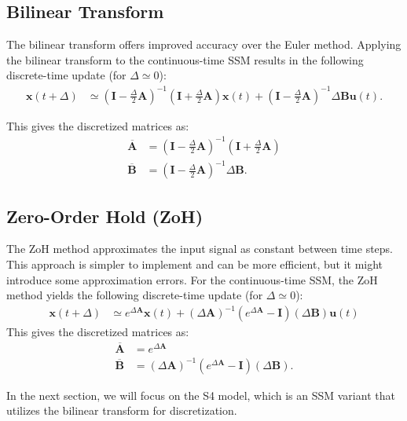 \documentclass[12pt,a4paper]{report}
\begin{document}
\subsection{Bilinear Transform}
The bilinear transform offers improved accuracy over the Euler method. Applying the bilinear transform to the continuous-time SSM results in the following discrete-time update (for $\Delta \simeq 0$):
\[
\begin{aligned}
\mathbf{x}(t+ \Delta) &\simeq \left(\mathbf{I} - \frac{\Delta}{2}\mathbf{A}\right)^{-1} \left(\mathbf{I} + \frac{\Delta}{2}\mathbf{A}\right)\mathbf{x}(t) + \left(\mathbf{I} - \frac{\Delta}{2}\mathbf{A}\right)^{-1} \Delta \mathbf{B}\mathbf{u}(t).
\end{aligned}
\]

This gives the discretized matrices as:
\[
\begin{aligned}
\mathbf{\overline{A}} &= \left(\mathbf{I} - \frac{\Delta}{2}\mathbf{A}\right)^{-1} \left(\mathbf{I} + \frac{\Delta}{2}\mathbf{A}\right) \\
\mathbf{\overline{B}} &= \left(\mathbf{I} - \frac{\Delta}{2}\mathbf{A}\right)^{-1} \Delta \mathbf{B}.
\end{aligned}
\]


\subsection{Zero-Order Hold (ZoH)}
The ZoH method approximates the input signal as constant between time steps. This approach is simpler to implement and can be more efficient, but it might introduce some approximation errors. For the continuous-time SSM, the ZoH method yields the following discrete-time update (for $\Delta \simeq 0$):
\[
\begin{aligned}
\mathbf{x}(t+ \Delta) &\simeq e^{\Delta \mathbf{A}} \mathbf{x}(t) + (\Delta \mathbf{A})^{-1}(e^{\Delta \mathbf{A}} - \mathbf{I})(\Delta \mathbf{B}) \mathbf{u}(t)
\end{aligned}
\]
This gives the discretized matrices as:
\[
\begin{aligned}
\mathbf{\overline{A}} &= e^{\Delta \mathbf{A}} \\
\mathbf{\overline{B}} &= (\Delta \mathbf{A})^{-1}(e^{\Delta \mathbf{A}} - \mathbf{I})(\Delta \mathbf{B}).
\end{aligned}
\]

In the next section, we will focus on the S4 model, which is an SSM variant that utilizes the bilinear transform for discretization.
\end{document}
